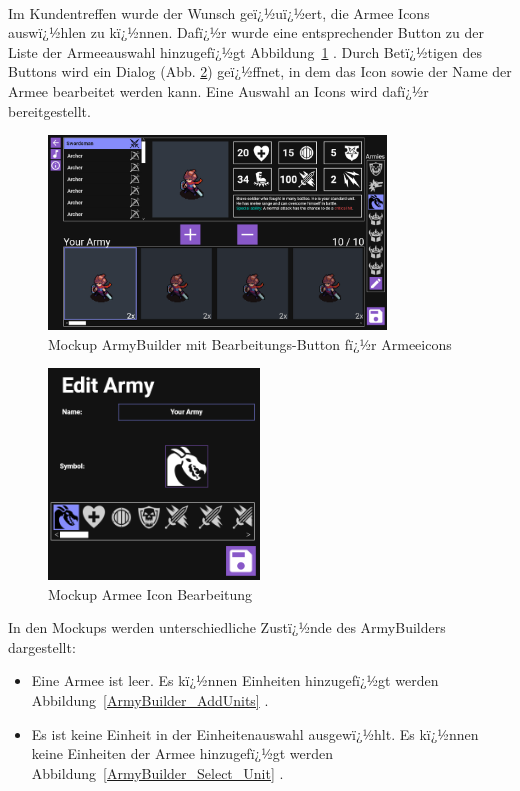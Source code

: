 \documentclass[12pt, titlepage]{scrartcl}
\newcommand{\Abb}[1]{%
	Abbildung\ \ref{#1}%
}
\begin{document}
		\ \\Im Kundentreffen wurde der Wunsch geï¿½uï¿½ert, die Armee Icons auswï¿½hlen zu kï¿½nnen. Dafï¿½r wurde eine entsprechender Button zu der Liste der Armeeauswahl hinzugefï¿½gt \Abb{ArmyBuilder_EditButton}. Durch Betï¿½tigen des Buttons wird ein Dialog (Abb. \ref{AmryEditor}) geï¿½ffnet, in dem das Icon sowie der Name der Armee bearbeitet werden kann. Eine Auswahl an Icons wird dafï¿½r bereitgestellt.
		\begin{figure}[H] 
			\centering
			\includegraphics[width=0.8\textwidth]{ArmyBuilder_Save_Edit.png}
			\caption{Mockup ArmyBuilder mit \glqq Bearbeitungs\grqq-Button fï¿½r Armeeicons}
			\label{ArmyBuilder_EditButton}
		\end{figure}
		\begin{figure}[H] 
			\centering
			\includegraphics[width=0.5\textwidth]{ArmyEditor.png}
			\caption{Mockup Armee Icon Bearbeitung}
			\label{AmryEditor}
		\end{figure}
		In den Mockups werden unterschiedliche Zustï¿½nde des ArmyBuilders dargestellt:
		\begin{itemize}
			\item Eine Armee ist leer. Es kï¿½nnen Einheiten hinzugefï¿½gt werden \Abb{ArmyBuilder_AddUnits}.
			\item Es ist keine Einheit in der Einheitenauswahl ausgewï¿½hlt. Es kï¿½nnen keine Einheiten der Armee hinzugefï¿½gt werden \Abb{ArmyBuilder_Select_Unit}. 
		\end{itemize}
\end{document}
